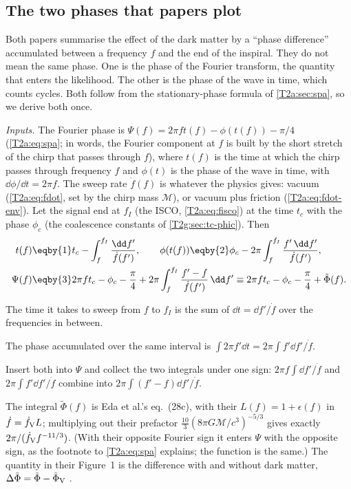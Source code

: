 \subsection{The two phases that papers plot}
\label{10b:sec:two-phases}

Both papers summarise the effect of the dark matter by a ``phase difference'' accumulated between a frequency $f$
and the end of the inspiral. They do not mean the same phase. One is the phase of the Fourier transform, the
quantity that enters the likelihood. The other is the phase of the wave in time, which counts cycles. Both follow
from the stationary-phase formula of \cref{T2a:sec:spa}, so we derive both once.

\emph{Inputs.} The Fourier phase is $\Psi(f)=2\pi ft(f)-\phi(t(f))-\pi/4$ (\cref{T2a:eq:spa}; in words, the Fourier
component at $f$ is built by the short stretch of the chirp that passes through $f$), where $t(f)$ is the
time at which the chirp passes through frequency $f$ and $\phi(t)$ is the phase of the wave in time, with
$\dd\phi/\dd t=2\pi f$. The sweep rate $\dot f(f)$ is whatever the physics gives: vacuum (\cref{T2a:eq:fdot}, set by the chirp mass
$\mathcal M$), or vacuum plus friction (\cref{T2a:eq:fdot-env}).
Let the signal end at $f_I$ (the ISCO, \cref{T2a:eq:fisco}) at the time $t_c$ with the phase $\phi_c$ (the coalescence
constants of \cref{T2g:sec:tc-phic}). Then
\begin{align}
  t(f)&\eqby{1}t_c-\int_f^{f_I}\frac{\dd f'}{\dot f(f')},\qquad
  \phi(t(f))\eqby{2}\phi_c-2\pi\int_f^{f_I}\frac{f'\,\dd f'}{\dot f(f')},\nonumber\\
  \Psi(f)&\eqby{3}2\pi ft_c-\phi_c-\frac\pi4+2\pi\int_f^{f_I}\frac{f'-f}{\dot f(f')}\,\dd f'
  \equiv2\pi ft_c-\phi_c-\frac\pi4+\tilde\Phi(f).
  \label{10b:eq:phitilde}
\end{align}
\begin{explain}
  \item The time it takes to sweep from $f$ to $f_I$ is the sum of $\dd t=\dd f'/\dot f$ over the frequencies in between.
  \item The phase accumulated over the same interval is $\int2\pi f'\dd t=2\pi\int f'\dd f'/\dot f$.
  \item Insert both into $\Psi$ and collect the two integrals under one sign: $2\pi f\int\dd f'/\dot f$ and
        $2\pi\int f'\dd f'/\dot f$ combine into $2\pi\int(f'-f)\dd f'/\dot f$.
\end{explain}
The integral $\tilde\Phi(f)$ is Eda et al.'s eq.~(28c), with their $L(f)=1+\epsilon(f)$ in $\dot f=\dot f_{\rm V}L$;
multiplying out their prefactor $\tfrac{10}{3}(8\pi G\mathcal M/c^3)^{-5/3}$ gives exactly $2\pi/(\dot f_{\rm V}f^{-11/3})$.
(With their opposite Fourier sign it enters $\Psi$ with the opposite sign, as the footnote to \cref{T2a:eq:spa}
explains; the function is the same.) The quantity in their Figure~1 is the difference with and without dark matter,
$\Delta\tilde\Phi=\tilde\Phi-\tilde\Phi_{\rm V}$ \cite[eq.~(29)]{Eda2015}.

